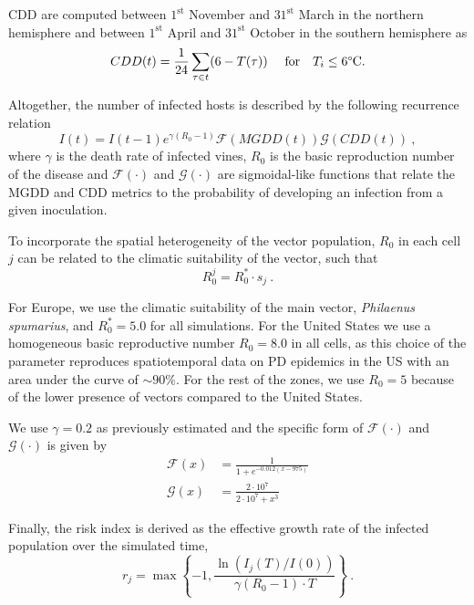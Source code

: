 CDD are computed between $1^{\mathrm{st}}$ November and $31^{\mathrm{st}}$
March in the northern hemisphere and between $1^{\mathrm{st}}$ April and
$31^{\mathrm{st}}$ October in the southern hemisphere as
\begin{equation}
    CDD(t)= \frac{1}{24}\sum_{\tau \in t} (6-T(\tau)) \ \quad \textrm{for}
    \quad T_i\le 6\textrm{\textdegree C} .	\label{eq:CDDdef}
\end{equation}

Altogether, the number of infected hosts is described by the following
recurrence relation
\begin{equation}
    I(t)=I(t-1)e^{\gamma(R_0-1)}\mathcal{F}(MGDD(t))\mathcal{G}(CDD(t)) \ ,
\end{equation}
where $\gamma$ is the death rate of infected vines, $R_0$ is the basic
reproduction number of the disease and $\mathcal{F}(\cdot)$ and
$\mathcal{G}(\cdot)$ are sigmoidal-like functions that relate the MGDD and CDD
metrics to the probability of developing an infection from a given inoculation.

To incorporate the spatial heterogeneity of the vector population, $R_0$ in
each cell $j$ can be related to the climatic suitability of the vector, such
that
\begin{equation}
    R_0^j=R_0^*\cdot s_j \ .
\end{equation}

For Europe, we use the climatic suitability of the main vector,
\textit{Philaenus spumarius}, and $R_0^*=5.0$ for all simulations. For the
United States we use a homogeneous basic reproductive number $R_0=8.0$ in all
cells, as this choice of the parameter reproduces spatiotemporal data on PD
epidemics in the US with an area under the curve of $\sim 90\%$. For the rest
of the zones, we use $R_0=5$ because of the lower presence of vectors compared
to the United States.

We use $\gamma=0.2$ as previously estimated \cite{Almeida2003} and the
specific form of $\mathcal{F}(\cdot)$ and $\mathcal{G}(\cdot)$ is given by
\begin{align}
    \mathcal{F}(x) & = \frac{1}{1+e^{-0.012(x-975)}}        \\
    \mathcal{G}(x) & = \frac{2\cdot10^7}{2\cdot 10^7 + x^3}
\end{align}

Finally, the risk index is derived as the effective growth rate of the
infected population over the simulated time,
\begin{equation}
    r_j=\max\left\{-1, \frac{\ln(I_j(T) / I(0))}{\gamma(R_0-1)\cdot
        T}\right\} \ .
\end{equation}

